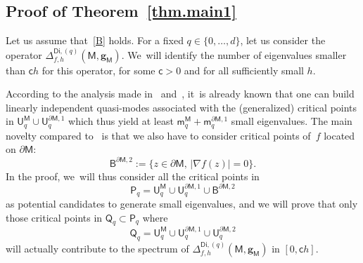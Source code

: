 \documentclass[10pt]{amsart}
\newcommand{\mbf}[1]{\mathbf{#1}}
\let\pa\partial
\theoremstyle{plain}
\theoremstyle{definition}
\begin{document}
\subsection{Proof of Theorem~\ref{thm.main1}}\label{sec.numb-small}
Let us assume that~\ref{B} holds.
For a fixed $q\in \{0,\ldots,d\}$, let us consider the operator $\Delta_{f,h}^{\mathsf{Di},(q)}(\mathsf M,\mbf g_{\mathsf M})$. We~will identify the number of eigenvalues smaller than $\mathsf c h$ for
this operator, for some $\mathsf c>0$ and for all
sufficiently small $h$.

According to the analysis made in~\cite[Chap.\,3]{helffer-nier-06}
and~\cite{helffer-sjostrand-85}, it~is already known that one can build linearly
independent quasi-modes associated with
the (generalized) critical points in $\mathsf U_q^{\mathsf M}\cup \mathsf U^{\pa \mathsf M,1}_q$ which thus yield
at least $\mathsf m_q^{\mathsf M}+\mathsf m_q^{\pa \mathsf M,1}$
small eigenvalues. The main novelty compared
to~\cite[Chap.\,3]{helffer-nier-06} is that we also have to consider critical
points of~$f$ located on $\partial \mathsf M$:
\begin{equation}\label{eq.defB}
\mathsf B^{\pa \mathsf M,2}:=\big \{z \in \pa \mathsf M, \, \vert \nabla f(z)\vert =0 \}.
\end{equation}
In the proof, we~will thus consider all the critical points in
\[
\mathsf P_q= \mathsf U_q^{\mathsf M}\cup \mathsf U^{\pa \mathsf M,1}_q\cup \mathsf B^{\pa \mathsf M,2}
\]
as potential candidates to generate small eigenvalues, and we will prove
that only those critical points in $\mathsf Q_q \subset \mathsf P_q$ where
\[
\mathsf Q_q= \mathsf U_q^{\mathsf M}\cup \mathsf U^{\pa \mathsf M,1}_q\cup \mathsf U^{\pa \mathsf M,2}_q
\]
will actually contribute to the spectrum of
$\Delta_{f,h}^{\mathsf{Di},(q)}(\mathsf M,\mbf g_{\mathsf M})$ in
$[0,\mathsf ch]$.
\end{document}

